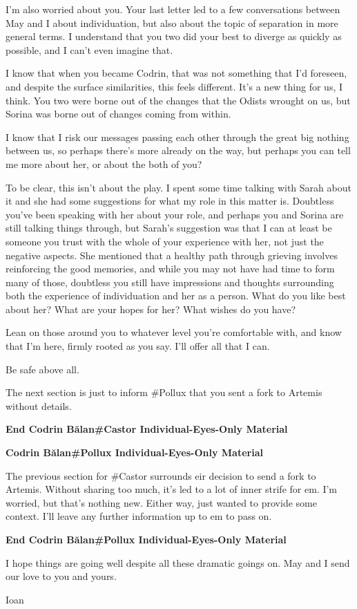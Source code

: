 I'm also worried about you. Your last letter led to a few conversations between May and I about individuation, but also about the topic of separation in more general terms. I understand that you two did your best to diverge as quickly as possible, and I can't even imagine that.

I know that when you became Codrin, that was not something that I'd foreseen, and despite the surface similarities, this feels different. It's a new thing for us, I think. You two were borne out of the changes that the Odists wrought on us, but Sorina was borne out of changes coming from within.

I know that I risk our messages passing each other through the great big nothing between us, so perhaps there's more already on the way, but perhaps you can tell me more about her, or about the both of you?

To be clear, this isn't about the play. I spent some time talking with Sarah about it and she had some suggestions for what my role in this matter is. Doubtless you've been speaking with her about your role, and perhaps you and Sorina are still talking things through, but Sarah's suggestion was that I can at least be someone you trust with the whole of your experience with her, not just the negative aspects. She mentioned that a healthy path through grieving involves reinforcing the good memories, and while you may not have had time to form many of those, doubtless you still have impressions and thoughts surrounding both the experience of individuation and her as a person. What do you like best about her? What are your hopes for her? What wishes do you have?

Lean on those around you to whatever level you're comfortable with, and know that I'm here, firmly rooted as you say. I'll offer all that I can.

Be safe above all.

The next section is just to inform \#Pollux that you sent a fork to Artemis without details.

\textbf{End Codrin Bălan\#Castor Individual-Eyes-Only Material}

\textbf{Codrin Bălan\#Pollux Individual-Eyes-Only Material}

The previous section for \#Castor surrounds eir decision to send a fork to Artemis. Without sharing too much, it's led to a lot of inner strife for em. I'm worried, but that's nothing new. Either way, just wanted to provide some context. I'll leave any further information up to em to pass on.

\textbf{End Codrin Bălan\#Pollux Individual-Eyes-Only Material}

I hope things are going well despite all these dramatic goings on. May and I send our love to you and yours.

Ioan
